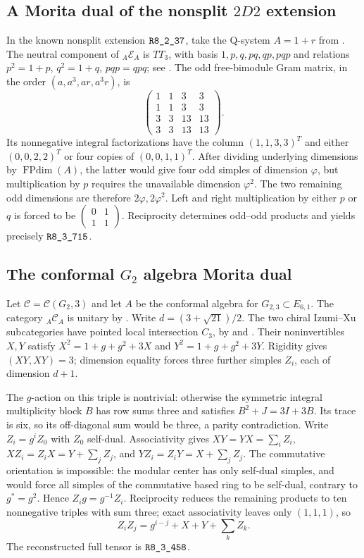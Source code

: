 \subsection{A Morita dual of the nonsplit $2D2$ extension}
In the known nonsplit extension $\sha{R8_2_37}$, take the Q-system $A=1+r$ from \cite[Lemma~4.1]{Grossman}. The neutral component of ${}_A\mathcal E_A$ is $TT_3$, with basis $1,p,q,pq,qp,pqp$ and relations $p^2=1+p$, $q^2=1+q$, $pqp=qpq$; see \cite[Definition~2.5]{EdieGolden}. The odd free-bimodule Gram matrix, in the order $(a,a^3,ar,a^3r)$, is
\[
 \begin{pmatrix}1&1&3&3\\1&1&3&3\\3&3&13&13\\3&3&13&13\end{pmatrix}.
\]
Its nonnegative integral factorizations have the column $(1,1,3,3)^T$ and either $(0,0,2,2)^T$ or four copies of $(0,0,1,1)^T$. After dividing underlying dimensions by $\operatorname{FPdim}(A)$, the latter would give four odd simples of dimension $\varphi$, but multiplication by $p$ requires the unavailable dimension $\varphi^2$. The two remaining odd dimensions are therefore $2\varphi,2\varphi^2$. Left and right multiplication by either $p$ or $q$ is forced to be $\left(\begin{smallmatrix}0&1\\1&1\end{smallmatrix}\right)$. Reciprocity determines odd--odd products and yields precisely $\sha{R8_3_715}$.

\subsection{The conformal $G_2$ algebra Morita dual}
Let $\mathcal C=\mathcal C(G_2,3)$ and let $A$ be the conformal algebra for $G_{2,3}\subset E_{6,1}$. The category ${}_A\mathcal C_A$ is unitary by \cite[Theorems~2.21,2.28, Corollary~3.32]{GuiQSystems}. Write $d=(3+\sqrt{21})/2$. The two chiral Izumi--Xu subcategories have pointed local intersection $C_3$, by \cite[Appendix~A.4]{CMSIzumiXu} and \cite[Section~3.3, equation~(16), Definition~3.12, Remark~3.13]{DMNO}. Their noninvertibles $X,Y$ satisfy $X^2=1+g+g^2+3X$ and $Y^2=1+g+g^2+3Y$. Rigidity gives $(XY,XY)=3$; dimension equality forces three further simples $Z_i$, each of dimension $d+1$.

The $g$-action on this triple is nontrivial: otherwise the symmetric integral multiplicity block $B$ has row sums three and satisfies $B^2+J=3I+3B$. Its trace is six, so its off-diagonal sum would be three, a parity contradiction. Write $Z_i=g^iZ_0$ with $Z_0$ self-dual. Associativity gives $XY=YX=\sum_i Z_i$, $XZ_i=Z_iX=Y+\sum_j Z_j$, and $YZ_i=Z_iY=X+\sum_j Z_j$. The commutative orientation is impossible: the modular center has only self-dual simples, and \cite[Lemma~8.49]{ENO} would force all simples of the commutative based ring to be self-dual, contrary to $g^*=g^2$. Hence $Z_ig=g^{-1}Z_i$. Reciprocity reduces the remaining products to ten nonnegative triples with sum three; exact associativity leaves only $(1,1,1)$, so
\[
 Z_iZ_j=g^{i-j}+X+Y+\sum_k Z_k.
\]
The reconstructed full tensor is $\sha{R8_3_458}$.


